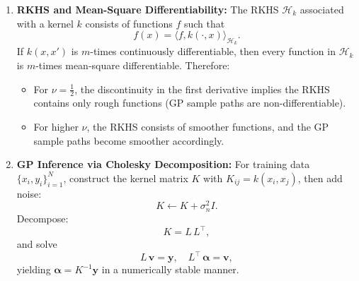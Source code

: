 \documentclass[11pt]{article}
\begin{document}
\begin{enumerate}[label=(\arabic*)]
    \item \textbf{RKHS and Mean-Square Differentiability:} 
    The RKHS $\mathcal{H}_k$ associated with a kernel $k$ consists of functions $f$ such that 
    \[
    f(x)=\langle f, k(\cdot,x)\rangle_{\mathcal{H}_k}.
    \]
    If $k(x,x')$ is $m$-times continuously differentiable, then every function in $\mathcal{H}_k$ is $m$-times mean-square differentiable. Therefore:
    \begin{itemize}
        \item For $\nu=\frac{1}{2}$, the discontinuity in the first derivative implies the RKHS contains only rough functions (GP sample paths are non-differentiable).
        \item For higher $\nu$, the RKHS consists of smoother functions, and the GP sample paths become smoother accordingly.
    \end{itemize}
    \item \textbf{GP Inference via Cholesky Decomposition:} 
    For training data $\{x_i, y_i\}_{i=1}^N$, construct the kernel matrix $K$ with $K_{ij}=k(x_i,x_j)$, then add noise:
    \[
    K\leftarrow K+\sigma_n^2 I.
    \]
    Decompose:
    \[
    K = L\,L^\top,
    \]
    and solve
    \[
    L\,\bm{v}=\bm{y},\quad L^\top\,\bm{\alpha}=\bm{v},
    \]
    yielding $\bm{\alpha}=K^{-1}\bm{y}$ in a numerically stable manner.
\end{enumerate}
\end{document}
